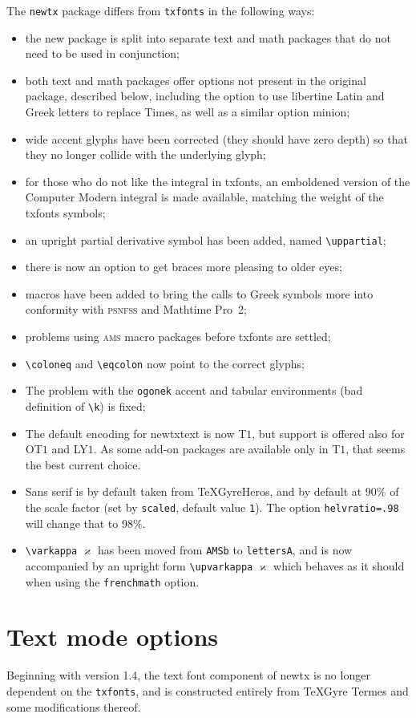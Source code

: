 \documentclass[11pt]{article}
\theoremstyle{oldplain}
\theoremstyle{plain}
\begin{document}
The {\tt newtx} package differs from {\tt txfonts} in the following ways:
\begin{itemize}
\item
the new package is split into separate text and math packages that do not need to be used in conjunction;
\item both text and math packages offer options not present in the original package, described below, including the option to use \textsf{libertine} Latin and Greek letters to replace \textsf{Times}, as well as a similar option \textsf{minion};
\item wide accent glyphs have been corrected (they should have zero depth) so that they no longer collide with the underlying glyph;
\item for those who do not like the integral in \textsf{txfonts}, an emboldened version of the Computer Modern integral is made available, matching the weight of the \textsf{txfonts} symbols;
\item an upright partial derivative symbol has been added, named \verb|\uppartial|;
\item there is now an option to get braces more pleasing to older eyes;
\item macros have been added to bring the calls to Greek symbols more into conformity with \textsc{psnfss} and Mathtime Pro~2;
\item problems using \textsc{ams} macro packages before \textsf{txfonts} are settled;
\item \verb|\coloneq| and \verb|\eqcolon| now point to the correct glyphs;
\item The problem with the {\tt ogonek} accent  and tabular environments (bad definition of \verb|\k|) is fixed;
\item The default encoding for \textsf{newtxtext} is now T$1$, but support is offered also for OT$1$ and LY$1$. As some add-on packages are available only in T$1$, that seems the best current choice.
\item Sans serif is by default taken from TeXGyreHeros, and by default at 90\% of the scale factor (set by {\tt scaled}, default value {\tt1}). The option {\tt helvratio=.98} will change that to 98\%.
\item \verb|\varkappa| $\varkappa$ has been moved from {\tt AMSb} to {\tt lettersA}, and is now accompanied by an upright form \verb|\upvarkappa| $\upvarkappa$ which behaves as it should when using the {\tt frenchmath} option.
\end{itemize}
\section{Text mode options}
Beginning with version 1.4, the text font component of \textsf{newtx} is no longer dependent on the {\tt txfonts}, and is constructed entirely from \textsf{TeXGyre Termes} and some modifications thereof.
\end{document}
